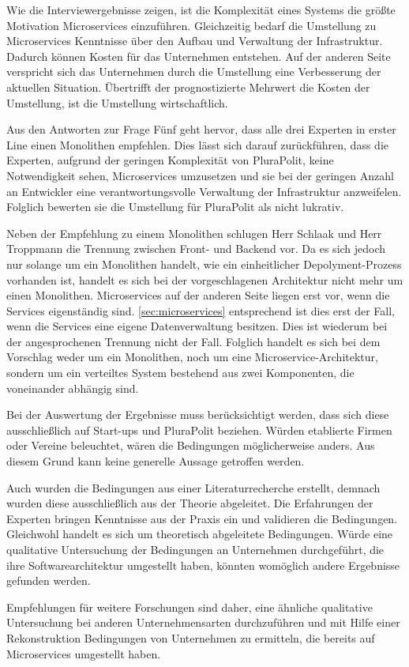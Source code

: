 Wie die Interviewergebnisse zeigen, ist die Komplexität eines Systems die größte Motivation Microservices einzuführen. Gleichzeitig bedarf die Umstellung zu Microservices Kenntnisse über den Aufbau und Verwaltung der Infrastruktur. Dadurch können Kosten für das Unternehmen entstehen. Auf der anderen Seite verspricht sich das Unternehmen durch die Umstellung eine Verbesserung der aktuellen Situation. Übertrifft der prognostizierte Mehrwert die Kosten der Umstellung, ist die Umstellung wirtschaftlich.

Aus den Antworten zur Frage Fünf geht hervor, dass alle drei Experten in erster Line einen Monolithen empfehlen. Dies lässt sich darauf zurückführen, dass die Experten, aufgrund der geringen Komplexität von PluraPolit, keine Notwendigkeit sehen, Microservices umzusetzen und sie bei der geringen Anzahl an Entwickler eine verantwortungsvolle Verwaltung der Infrastruktur anzweifelen. Folglich bewerten sie die Umstellung für PluraPolit als nicht lukrativ.

Neben der Empfehlung zu einem Monolithen schlugen Herr Schlaak und Herr Troppmann die Trennung zwischen Front- und Backend vor.
Da es sich jedoch nur solange um ein Monolithen handelt, wie ein einheitlicher Depolyment-Prozess vorhanden ist, handelt es sich bei der vorgeschlagenen Architektur nicht mehr um einen Monolithen.
Microservices auf der anderen Seite liegen erst vor, wenn die Services eigenständig sind. \cref{sec:microservices} entsprechend ist dies erst der Fall, wenn die Services eine eigene Datenverwaltung besitzen. Dies ist wiederum bei der angesprochenen Trennung nicht der Fall. Folglich handelt es sich bei dem Vorschlag weder um ein Monolithen, noch um eine Microservice-Architektur, sondern um ein verteiltes System bestehend aus zwei Komponenten, die voneinander abhängig sind.

Bei der Auswertung der Ergebnisse muss berücksichtigt werden, dass sich diese ausschließlich auf Start-ups und PluraPolit beziehen. Würden etablierte Firmen oder Vereine beleuchtet, wären die Bedingungen möglicherweise anders. Aus diesem Grund kann keine generelle Aussage getroffen werden.

Auch wurden die Bedingungen aus einer Literaturrecherche erstellt, demnach wurden diese ausschließlich aus der Theorie abgeleitet. Die Erfahrungen der Experten bringen Kenntnisse aus der Praxis ein und validieren die Bedingungen. 
Gleichwohl handelt es sich um theoretisch abgeleitete Bedingungen.
Würde eine qualitative Untersuchung der Bedingungen an Unternehmen durchgeführt, die ihre Softwarearchitektur umgestellt haben, könnten womöglich andere Ergebnisse gefunden werden.

Empfehlungen für weitere Forschungen sind daher, eine ähnliche qualitative Untersuchung bei anderen Unternehmensarten durchzuführen und mit Hilfe einer Rekonstruktion Bedingungen von Unternehmen zu ermitteln, die bereits auf Microservices umgestellt haben.
